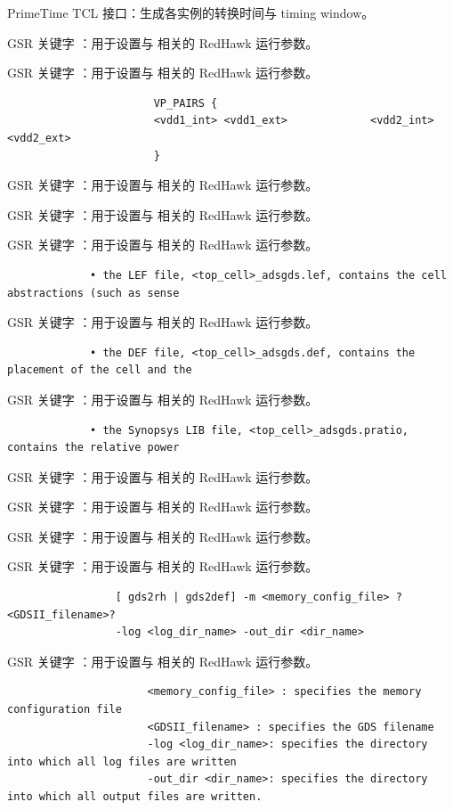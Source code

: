 PrimeTime TCL 接口：生成各实例的转换时间与 timing window。

GSR 关键字 ：用于设置与  相关的 RedHawk 运行参数。

GSR 关键字 ：用于设置与  相关的 RedHawk 运行参数。

\begin{lstlisting}
                       VP_PAIRS {
                       <vdd1_int> <vdd1_ext>             <vdd2_int> <vdd2_ext>
                       }
\end{lstlisting}

GSR 关键字 ：用于设置与  相关的 RedHawk 运行参数。

GSR 关键字 ：用于设置与  相关的 RedHawk 运行参数。

GSR 关键字 ：用于设置与  相关的 RedHawk 运行参数。

\begin{lstlisting}
             • the LEF file, <top_cell>_adsgds.lef, contains the cell abstractions (such as sense
\end{lstlisting}

GSR 关键字 ：用于设置与  相关的 RedHawk 运行参数。

\begin{lstlisting}
             • the DEF file, <top_cell>_adsgds.def, contains the placement of the cell and the
\end{lstlisting}

GSR 关键字 ：用于设置与  相关的 RedHawk 运行参数。

\begin{lstlisting}
             • the Synopsys LIB file, <top_cell>_adsgds.pratio, contains the relative power
\end{lstlisting}

GSR 关键字 ：用于设置与  相关的 RedHawk 运行参数。

GSR 关键字 ：用于设置与  相关的 RedHawk 运行参数。

GSR 关键字 ：用于设置与  相关的 RedHawk 运行参数。

GSR 关键字 ：用于设置与  相关的 RedHawk 运行参数。

\begin{lstlisting}
                 [ gds2rh | gds2def] -m <memory_config_file> ?<GDSII_filename>?
                 -log <log_dir_name> -out_dir <dir_name>
\end{lstlisting}

GSR 关键字 ：用于设置与  相关的 RedHawk 运行参数。

\begin{lstlisting}
                      <memory_config_file> : specifies the memory configuration file
                      <GDSII_filename> : specifies the GDS filename
                      -log <log_dir_name>: specifies the directory into which all log files are written
                      -out_dir <dir_name>: specifies the directory into which all output files are written.
\end{lstlisting}

